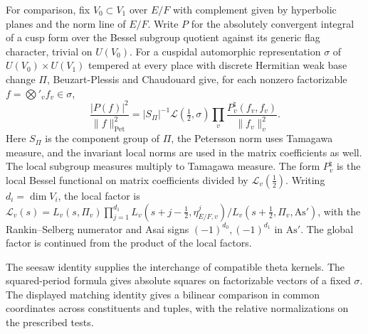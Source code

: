 For comparison, fix \(V_0\subset V_1\) over \(E/F\) with complement
given by hyperbolic planes and the norm line of \(E/F\). Write \(P\)
for the absolutely convergent integral of a cusp form over the
Bessel subgroup quotient against its generic flag character,
trivial on \(U(V_0)\). For a cuspidal
automorphic representation \(\sigma\) of \(U(V_0)\times U(V_1)\)
tempered at every place with discrete Hermitian weak base change
\(\Pi\), Beuzart-Plessis and Chaudouard give, for each nonzero
factorizable \(f=\bigotimes'_v f_v\in\sigma\),
\[
 \frac{|P(f)|^2}{\|f\|_{\mathrm{Pet}}^2}
 = |S_\Pi|^{-1}\mathcal L(\tfrac12,\sigma)
   \prod_v\frac{P_v^\natural(f_v,f_v)}{\|f_v\|_v^2}.
\]
Here \(S_\Pi\) is the component group of \(\Pi\), the Petersson norm
uses Tamagawa measure, and the invariant local norms are used in the
matrix coefficients as well. The local subgroup measures multiply
to Tamagawa measure. The form \(P_v^\natural\) is the local Bessel
functional on matrix coefficients divided by \(\mathcal L_v(\tfrac12)\).
Writing \(d_i=\dim V_i\), the local factor is
\(\mathcal L_v(s)=L_v(s,\Pi_v)\prod_{j=1}^{d_1}
L_v(s+j-\tfrac12,\eta_{E/F,v}^j)/L_v(s+\tfrac12,\Pi_v,\mathrm{As}')\),
with the Rankin--Selberg numerator and Asai signs
\((-1)^{d_0},(-1)^{d_1}\) in \(\mathrm{As}'\).
The global factor is continued from the product of the local factors.
\cite[\S\S1.3.1--1.3.2, \S1.3.5 and Theorem~1.3.6.1]{p2bp-chaudouard-bessel}

The seesaw identity supplies the interchange of compatible theta
kernels. The squared-period formula gives absolute squares on
factorizable vectors of a fixed \(\sigma\). The displayed matching
identity gives a bilinear comparison in common coordinates across
constituents and tuples, with the relative normalizations on the
prescribed tests.
